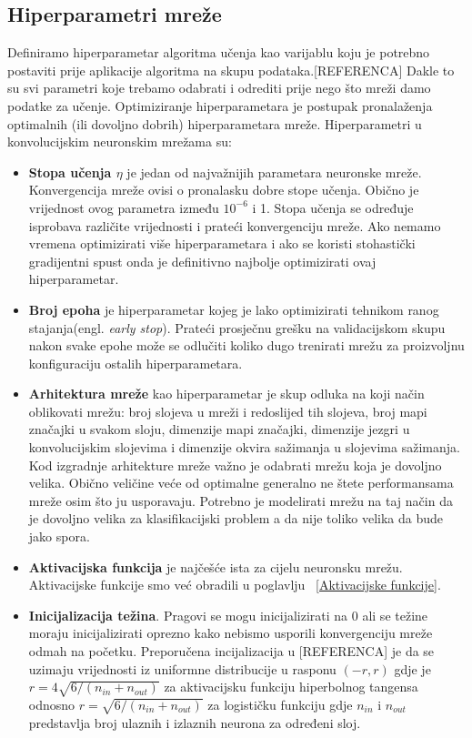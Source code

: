 \documentclass[times, utf8, zavrsni]{fer}
\begin{document}
\subsection{Hiperparametri mreže}
Definiramo hiperparametar algoritma učenja kao varijablu koju je potrebno postaviti prije aplikacije algoritma na skupu podataka.[REFERENCA] Dakle to su svi parametri koje trebamo odabrati i odrediti prije nego što mreži damo podatke za učenje. Optimiziranje hiperparametara je postupak pronalaženja optimalnih (ili dovoljno dobrih) hiperparametara mreže. Hiperparametri u konvolucijskim neuronskim mrežama su:
\begin{itemize}
\renewcommand\labelitemi{$\bullet$}
\item \textbf{Stopa učenja $\eta$} je jedan od najvažnijih parametara neuronske mreže. Konvergencija mreže ovisi o pronalasku dobre stope učenja. Obično je vrijednost ovog parametra između $10^{-6}$ i 1. Stopa učenja se određuje isprobava različite vrijednosti i prateći konvergenciju mreže. Ako nemamo vremena optimizirati više hiperparametara i ako se koristi stohastički gradijentni spust onda je definitivno najbolje optimizirati ovaj hiperparametar.

\item \textbf{Broj epoha} je hiperparametar kojeg je lako optimizirati tehnikom ranog stajanja(engl. \textit{early stop}). Prateći prosječnu grešku na validacijskom skupu nakon svake epohe može se odlučiti koliko dugo trenirati mrežu za proizvoljnu konfiguraciju ostalih hiperparametara.

\item \textbf{Arhitektura mreže} kao hiperparametar je skup odluka na koji način oblikovati mrežu: broj slojeva u mreži i redoslijed tih slojeva, broj mapi značajki u svakom sloju, dimenzije mapi značajki,
dimenzije jezgri u konvolucijskim slojevima i dimenzije okvira sažimanja u slojevima sažimanja. Kod izgradnje arhitekture mreže važno je odabrati mrežu koja je dovoljno velika. Obično veličine veće od optimalne generalno ne štete performansama mreže osim što ju usporavaju. Potrebno je modelirati mrežu na taj način da je dovoljno velika za klasifikacijski problem a da nije toliko velika da bude jako spora.

\item \textbf{Aktivacijska funkcija} je najčešće ista za cijelu neuronsku mrežu. Aktivacijske funkcije smo već obradili u poglavlju ~\ref{Aktivacijske funkcije}. 

\item \textbf{Inicijalizacija težina}. Pragovi se mogu inicijalizirati na 0 ali se težine moraju inicijalizirati oprezno kako nebismo usporili konvergenciju mreže odmah na početku. Preporučena incijalizacija u [REFERENCA] je da se uzimaju vrijednosti iz uniformne distribucije u rasponu $(-r, r)$ gdje je $r = 4\sqrt{6/(n_{in} + n_{out})}$ za aktivacijsku funkciju hiperbolnog tangensa odnosno $r = \sqrt{6/(n_{in} + n_{out})}$ za logističku funkciju gdje $n_{in}$ i $n_{out}$ predstavlja broj ulaznih i izlaznih neurona za određeni sloj.


\end{itemize}
\end{document}
